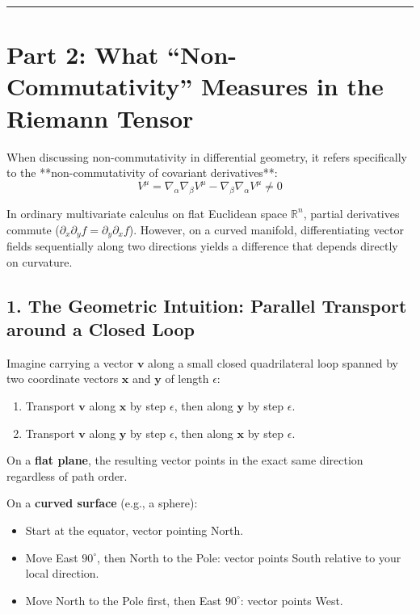 \documentclass[11pt,a4paper]{article}
\begin{document}
	\vspace{1.5em}
	\hrule
	\vspace{1.5em}
	
	\section{Part 2: What ``Non-Commutativity'' Measures in the Riemann Tensor}
	
	When discussing non-commutativity in differential geometry, it refers specifically to the **non-commutativity of covariant derivatives**:
	\begin{equation}
		[\nabla_\alpha, \nabla_\beta] V^\mu = \nabla_\alpha \nabla_\beta V^\mu - \nabla_\beta \nabla_\alpha V^\mu \neq 0
	\end{equation}
	
	In ordinary multivariate calculus on flat Euclidean space $\mathbb{R}^n$, partial derivatives commute ($\partial_x \partial_y f = \partial_y \partial_x f$). However, on a curved manifold, differentiating vector fields sequentially along two directions yields a difference that depends directly on curvature.
	
	\subsection{1. The Geometric Intuition: Parallel Transport around a Closed Loop}
	
	Imagine carrying a vector $\mathbf{v}$ along a small closed quadrilateral loop spanned by two coordinate vectors $\mathbf{x}$ and $\mathbf{y}$ of length $\epsilon$:
	\begin{enumerate}
		\item Transport $\mathbf{v}$ along $\mathbf{x}$ by step $\epsilon$, then along $\mathbf{y}$ by step $\epsilon$.
		\item Transport $\mathbf{v}$ along $\mathbf{y}$ by step $\epsilon$, then along $\mathbf{x}$ by step $\epsilon$.
	\end{enumerate}
	
	\noindent On a \textbf{flat plane}, the resulting vector points in the exact same direction regardless of path order.
	
	\noindent On a \textbf{curved surface} (e.g., a sphere):
	\begin{itemize}
		\item Start at the equator, vector pointing North.
		\item Move East $90^\circ$, then North to the Pole: vector points South relative to your local direction.
		\item Move North to the Pole first, then East $90^\circ$: vector points West.
	\end{itemize}
	
\end{document}
